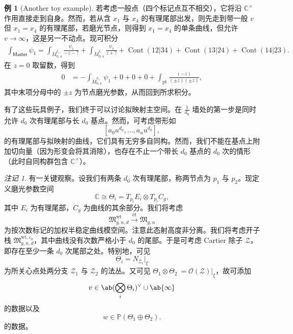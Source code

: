 \documentclass{amsart}
\theoremstyle{definition}
\newtheorem{exm}[thm]{例}
\theoremstyle{remark}
\newtheorem{rmk}[thm]{注记}
\theoremstyle{plain}
\theoremstyle{definition}
\theoremstyle{remark}
\newcommand{\C}{\mathbb{C}}
\renewcommand{\P}{\mathbb{P}}
\newcommand{\ep}{\varepsilon}
\newcommand{\mc}[1]{\mathcal{#1}}
\newcommand{\mf}[1]{\mathfrak{#1}}
\newcommand{\mr}[1]{\mathrm{#1}}
\newcommand{\on}[1]{\operatorname{#1}}
\newcommand{\ms}[1]{\mathsf{#1}}
\newcommand{\1}{\mathbf{1}}
\newcommand{\2}{\mathbf{2}}
\newcommand{\3}{\mathbf{3}}
\begin{document}
\begin{exm}[Another toy example]
    若考虑一般点（四个标记点互不相交），它将沿 \(\C^{\times}\) 作用直接走到自身。然而，若从含 \(x_1\) 与 \(x_4\) 的有理尾部出发，则先走到带一般 \(v\) 但 \(x_1 = x_4\) 的有理尾部，若磨光节点，则得到 \(x_1 = x_4\) 的单条曲线，但允许 \(v \to \infty\)，这是另一不动点。现可积分
    \begin{align*}
        \int_{\ms{Master}} \psi_1 = \int_{\bar{M}_{0,4}^{\delta_+}} \frac{\psi_1}{-z-?} + \int_{\bar{M}_{0,4}^{\delta_-}} \frac{\psi_1}{z+?} + \on{Cont}(12|34) + \on{Cont}(13|24) + \on{Cont}(14|23).
    \end{align*}
    在 \(z = 0\) 取留数，得到
    \begin{align*}
        0 &= - \int_{\bar{M}_{0,4}^{\delta_+}} \psi_1 + 0 + 0 + 0 + \int_{\mr{pt}} \frac{(-z)}{(\pm z)(\pm z)},
    \end{align*}
    其中末项分母中的 \(\pm z\) 为节点磨光参数，从而回到所求积分。
\end{exm}

有了这些玩具例子，我们终于可以讨论拟映射主空间。在 \(\frac{1}{d_0}\) 墙处的第一步是同时允许 \(d_0\) 次有理尾部与长 \(d_0\) 基点。然而，可考虑带形如
\[ [a_0 u^{d_0}, \ldots, a_n u^{d_0}], \]
的有理尾部与拟映射的曲线，它们具有无穷多自同构。然而，我们不能在基点上附加切向量（因为形变会将其消除），也存在不止一个带长 \(d_0\) 基点的 \(d_0\) 次的情形（此时自同构群包含 \(\C^{\times}\)）。

\begin{rmk}
    有一关键观察。设我们有两条 \(d_0\) 次有理尾部，称两节点为 \(p_1\) 与 \(p_2\)。现定义磨光参数空间
    \[ \C \cong \Theta_i = T_{p_i} E_i \otimes T_{p_i} C_g, \]
    其中 \(E_i\) 为有理尾部，\(C_g\) 为曲线的其余部分。我们将考虑
    \[ \mf{M}_{g,n,d}^{\mr{wt}} \xrightarrow{\text{\'et}} \mf{M}_{g,n} \]
    为按次数标记的加权半稳定曲线模空间。注意此态射高度非分离。我们将考虑开子栈 \(\mf{M}_{g,n,d}^{\mr{wt}, \ep_0}\)，其中曲线没有次数严格小于 \(d_0\) 的尾部。于是可考虑 Cartier 除子 \(\mc{Z}\)，即存在至少一条 \(d_0\) 次尾部之处。特别地，可见
    \[ \Theta_i = N_{\mc{Z}_i} |_{\xi} \]
    为所关心点处两分支 \(\mc{Z}_1\) 与 \(\mc{Z}_2\) 的法丛。又可见 \(\Theta_1 \otimes \Theta_2\ = \mc{O}(\mc{Z})|_{\xi}\)，故可添加
    \[ v \in \ab(\bigotimes_i \Theta_i)^{\vee} \cup \ab\{\infty\} \]
    的数据以及
    \[ w \in \P(\Theta_1 \oplus\Theta_2). \]
    的数据。
\end{rmk}
\end{document}
